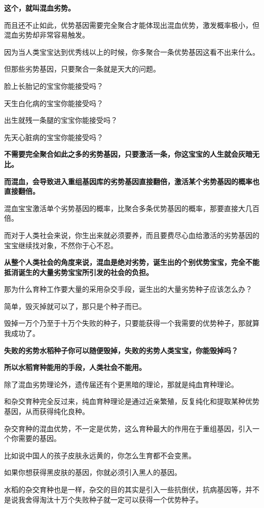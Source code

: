 \documentclass[UTF8, 11pt, oneside]{ctexart}
\newcommand{\zd}[1]{\textbf{\textcolor[RGB]{123,12,0}{#1}}} %
\begin{document}
\zd{这个，就叫混血劣势。}

而且还不止如此，优势基因需要完全聚合才能体现出混血优势，激发概率极小，但混血劣势却非常容易触发。

因为当人类宝宝达到优秀线以上的时候，你多聚合一条优势基因这看不出来什么。

但那些劣势基因，只要聚合一条就是天大的问题。

脸上长胎记的宝宝你能接受吗？

天生白化病的宝宝你能接受吗？

出生就残一条腿的宝宝你能接受吗？

先天心脏病的宝宝你能接受吗？

\zd{不需要完全聚合如此之多的劣势基因，只要激活一条，你这宝宝的人生就会灰暗无比。}

\zd{而混血，会导致进入重组基因库的劣势基因直接翻倍，激活某个劣势基因的概率也直接翻倍。}

混血宝宝激活单个劣势基因的概率，比聚合多条优势基因的概率，那要直接大几百倍。

而对于人类社会来说，你生出来就必须要养，而且要费尽心血给激活的劣势基因的宝宝继续找对象，不然你于心不忍。

\zd{从整个人类社会的角度来说，混血是绝对劣势，诞生出的个别优势宝宝，完全不能抵消诞生的大量劣势宝宝所引发的社会的负担。}

那为什么育种工作要大量的采用杂交手段，诞生出的大量劣势种子应该怎么办？

简单，毁灭掉就可以了，那只是个种子而已。

毁掉一万个乃至于十万个失败的种子，只要能获得一个我需要的优势种子，那就算我成功了。

\zd{失败的劣势水稻种子你可以随便毁掉，失败的劣势人类宝宝，你能毁掉吗？}

\zd{所以水稻育种能用的手段，人类社会不能用。}

除了混血劣势理论外，遗传届还有个更黑暗的理论，那就是纯血育种理论。

和杂交育种完全反过来，纯血育种理论是通过近亲繁殖，反复纯化和提取某种优势基因，从而获得纯化良种。

杂交育种的混血优势，不一定是优势，这么育种最大的作用在于重组基因，引入一个你需要的基因。

比如说中国人的孩子皮肤永远黄的，你怎么生育都不会变黑。

如果你想获得黑皮肤的基因，你就必须引入黑人的基因。

水稻的杂交育种也是一样，杂交的目的其实是引入一些抗倒伏，抗病基因等，并不是说我舍得淘汰十万个失败种子就一定可以获得一个优势种子。
\end{document}
